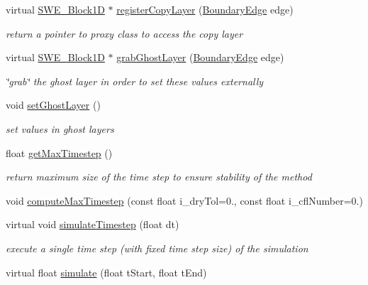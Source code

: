 \begin{DoxyCompactItemize}
virtual \hyperlink{structSWE__Block1D}{S\+W\+E\+\_\+\+Block1D} $\ast$ \hyperlink{classSWE__Block_a827ee5c61dc9c1b472ac8b4e1c19956a}{register\+Copy\+Layer} (\hyperlink{scenarios_2SWE__Scenario_8hh_aa5e01e3f7df312f7b9b0d02521141fcc}{Boundary\+Edge} edge)
\begin{DoxyCompactList}\small\item\em return a pointer to proxy class to access the copy layer \end{DoxyCompactList}\item 
virtual \hyperlink{structSWE__Block1D}{S\+W\+E\+\_\+\+Block1D} $\ast$ \hyperlink{classSWE__Block_a9a96c59444645e237d098803009158a3}{grab\+Ghost\+Layer} (\hyperlink{scenarios_2SWE__Scenario_8hh_aa5e01e3f7df312f7b9b0d02521141fcc}{Boundary\+Edge} edge)
\begin{DoxyCompactList}\small\item\em \char`\"{}grab\char`\"{} the ghost layer in order to set these values externally \end{DoxyCompactList}\item 
void \hyperlink{classSWE__Block_afd17334abee3145e27cc3c9b7b935da2}{set\+Ghost\+Layer} ()
\begin{DoxyCompactList}\small\item\em set values in ghost layers \end{DoxyCompactList}\item 
float \hyperlink{classSWE__Block_a74da1eb712e639e47b5b848081b2afad}{get\+Max\+Timestep} ()
\begin{DoxyCompactList}\small\item\em return maximum size of the time step to ensure stability of the method \end{DoxyCompactList}\item 
void \hyperlink{classSWE__Block_acf2ff6617cbc0d3d837f0e618039cfe2}{compute\+Max\+Timestep} (const float i\+\_\+dry\+Tol=0., const float i\+\_\+cfl\+Number=0.)
\item 
virtual void \hyperlink{classSWE__Block_add6908e1ceb261a0a1f3ebc262cc5f11}{simulate\+Timestep} (float dt)
\begin{DoxyCompactList}\small\item\em execute a single time step (with fixed time step size) of the simulation \end{DoxyCompactList}\item 
virtual float \hyperlink{classSWE__Block_a69784e2be2d09035fb2af9d306768f07}{simulate} (float t\+Start, float t\+End)
\item 

\end{DoxyCompactItemize}
